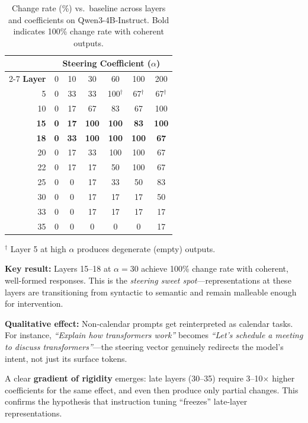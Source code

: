 \documentclass[11pt,a4paper]{article}
\begin{document}
\begin{table}[H]
\centering
\caption{Change rate (\%) vs.\ baseline across layers and coefficients on Qwen3-4B-Instruct. Bold indicates 100\% change rate with coherent outputs.}
\label{tab:midlayer_sweep}
\small
\begin{tabular}{rcccccc}
\toprule
& \multicolumn{6}{c}{\textbf{Steering Coefficient ($\alpha$)}} \\
\cmidrule(lr){2-7}
\textbf{Layer} & 0 & 10 & 30 & 60 & 100 & 200 \\
\midrule
5  & 0 & 33 & 33 & 100$^\dagger$ & 67$^\dagger$ & 67$^\dagger$ \\
10 & 0 & 17 & 67 & 83 & 67 & 100 \\
\textbf{15} & \textbf{0} & \textbf{17} & \textbf{100} & \textbf{100} & \textbf{83} & \textbf{100} \\
\textbf{18} & \textbf{0} & \textbf{33} & \textbf{100} & \textbf{100} & \textbf{100} & \textbf{67} \\
20 & 0 & 17 & 33 & 100 & 100 & 67 \\
22 & 0 & 17 & 17 & 50 & 100 & 67 \\
25 & 0 & 0 & 17 & 33 & 50 & 83 \\
30 & 0 & 0 & 17 & 17 & 17 & 50 \\
33 & 0 & 0 & 17 & 17 & 17 & 17 \\
35 & 0 & 0 & 0 & 0 & 0 & 17 \\
\bottomrule
\end{tabular}
\vspace{2pt}

{\footnotesize $^\dagger$ Layer 5 at high $\alpha$ produces degenerate (empty) outputs.}
\end{table}

\textbf{Key result:} Layers 15--18 at $\alpha=30$ achieve 100\% change rate with coherent, well-formed responses. This is the \textit{steering sweet spot}---representations at these layers are transitioning from syntactic to semantic and remain malleable enough for intervention.

\textbf{Qualitative effect:} Non-calendar prompts get reinterpreted as calendar tasks. For instance, \textit{``Explain how transformers work''} becomes \textit{``Let's schedule a meeting to discuss transformers''}---the steering vector genuinely redirects the model's intent, not just its surface tokens.

A clear \textbf{gradient of rigidity} emerges: late layers (30--35) require 3--10$\times$ higher coefficients for the same effect, and even then produce only partial changes. This confirms the hypothesis that instruction tuning ``freezes'' late-layer representations.
\end{document}
